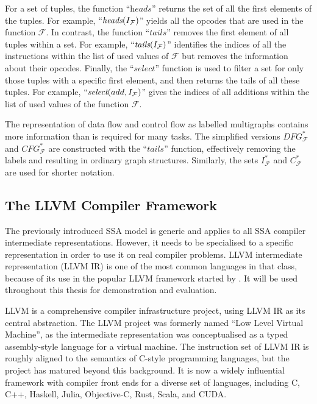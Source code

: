     For a set of tuples, the function ``$\textit{heads}$'' returns the set of
    all the first elements of the tuples.
    For example, $``\textit{heads}(I_\mathcal F)$'' yields all the opcodes that
    are used in the function $\mathcal F$.
    In contrast, the function ``$\textit{tails}$'' removes the first element of
    all tuples within a set.
    For example, $``\textit{tails}(I_\mathcal F)$'' identifies the indices of
    all the instructions within the list of used values of $\mathcal F$ but
    removes the information about their opcodes.
    Finally, the ``$\textit{select}$'' function is used to filter a set for only
    those tuples with a specific first element, and then returns the tails of
    all these tuples.
    For example, $``\textit{select}(add,I_\mathcal F)$'' gives the indices of
    all additions within the list of used values of the function $\mathcal F$.

    The representation of data flow and control flow as labelled multigraphs
    contains more information than is required for many tasks.
    The simplified versions $DFG_\mathcal F^*$ and $CFG_\mathcal F^*$ are
    constructed with the ``$\textit{tails}$'' function, effectively removing the
    labels and resulting in ordinary graph structures.
    Similarly, the sets $I_\mathcal F^*$ and $C_\mathcal F^*$ are used for
    shorter notation.

\subsection{The LLVM Compiler Framework}

    The previously introduced SSA model is generic and applies to all SSA
    compiler intermediate representations.
    However, it needs to be specialised to a specific representation in
    order to use it on real compiler problems.
    LLVM intermediate representation (LLVM IR) is one of the most common
    languages in that class, because of its use in the popular LLVM
    framework started by \citet{lattner2004llvm}.
    It will be used throughout this thesis for demonstration and evaluation.

    LLVM is a comprehensive compiler infrastructure project, using LLVM IR as
    its central abstraction.
    The LLVM project was formerly named ``Low Level Virtual Machine'', as the
    intermediate representation was conceptualised as a typed assembly-style
    language for a virtual machine.
    The instruction set of LLVM IR is roughly aligned to the semantics of
    C-style programming languages, but the project has matured beyond this
    background.
    It is now a widely influential framework with compiler front ends
    for a diverse set of languages, including C, C++, Haskell, Julia,
    Objective-C, Rust, Scala, and CUDA.

